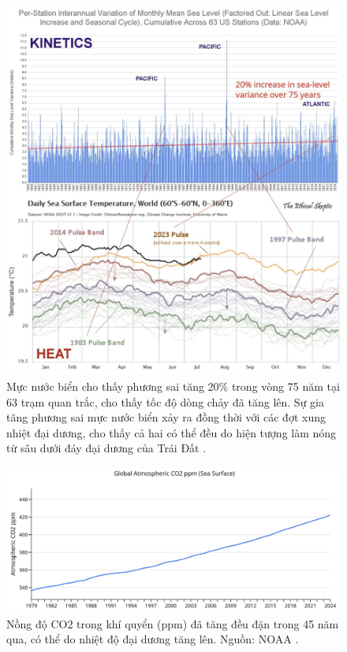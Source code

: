 \documentclass[10pt,twocolumn,letterpaper]{article}
\begin{document}
\begin{figure}[t]
\begin{center}
\includegraphics[width=1\textwidth]{sealevel.jpeg}
\end{center}
   \caption{Mực nước biển cho thấy phương sai tăng 20\% trong vòng 75 năm tại 63 trạm quan trắc, cho thấy tốc độ dòng chảy đã tăng lên. Sự gia tăng phương sai mực nước biển xảy ra đồng thời với các đợt xung nhiệt đại dương, cho thấy cả hai có thể đều do hiện tượng làm nóng từ sâu dưới đáy đại dương của Trái Đất \cite{2,129}.}
\label{fig:22}
\end{figure}

\begin{figure}[t]
\begin{center}
\includegraphics[width=1\textwidth]{co2.jpg}
\end{center}
   \caption{Nồng độ CO2 trong khí quyển (ppm) đã tăng đều đặn trong 45 năm qua, có thể do nhiệt độ đại dương tăng lên. Nguồn: NOAA \cite{148,129}.}
\label{fig:23}
\end{figure}
\end{document}
